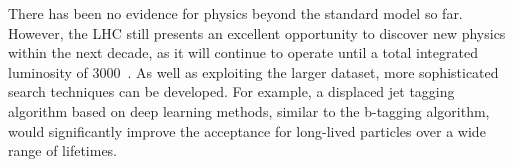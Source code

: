 There has been no evidence for physics beyond the standard model so far. 
However, the LHC still presents an excellent opportunity to discover new 
physics within the next decade, as it will continue to operate until a total 
integrated luminosity of 3000~\ifb. As well as exploiting the larger dataset, 
more sophisticated search techniques can be developed. For example, a displaced 
jet tagging algorithm based on deep learning methods, similar to the b-tagging 
algorithm, would significantly improve the acceptance for long-lived particles 
over a wide range of lifetimes.

\begin{comment}
Prompt search retains some sensitivity 
for long (short) gluino (DM) lifetimes (and is the most sensitive sub-cm and 
lifetimes beyond the detector, hence continue with prompt search in future), 
although clearly could be improved with a dedicated search/tagger as shown by 
the b-tag effects.

Mention improvements using ML tagger for all displacements (extending the 
b-tagging algorithm) and list of things to take advantage in OB DM LL page 7.
see Rob_EXO_LL_tagger.
exploit jet id variables (eg chf etc), use ML/DL

see thomas strebler/mattkomm
displaced jet tagger
https://arxiv.org/pdf/1711.09120.pdf
\end{comment}


